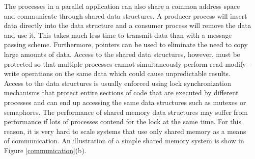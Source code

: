 \documentclass[11pt]{book}
\begin{document}
The processes in a parallel application can also share a common address space and communicate
through shared data structures.  A producer process will insert data directly into the data
structure and a consumer process will remove the data and use it.  This takes much less time to
transmit data than with a message passing scheme.  Furthermore, pointers can be used to eliminate
the need to copy large amounts of data.  Access to the shared data structures, however, must be
protected so that multiple processes cannot simultaneously perform read-modify-write operations on
the same data which could cause unpredictable results.  Access to the data structures is usually
enforced using lock synchronization mechanisms that protect entire sections of code that are
executed by different processes and can end up accessing the same data structures such as mutexes or
semaphores.  The performance of shared memory data structures may suffer from performance if lots of
processes contend for the lock at the same time.  For this reason, it is very hard to scale systems
that use only shared memory as a means of communication.  An illustration of a simple shared memory
system is show in Figure \ref{communication}(b).
\end{document}
